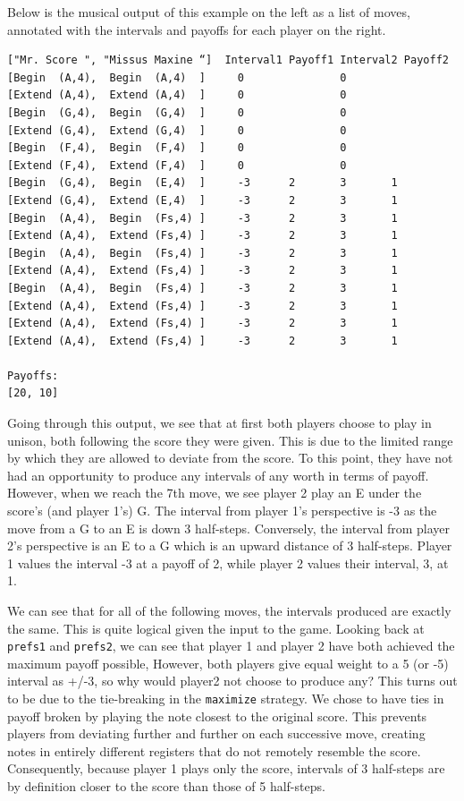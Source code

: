 \documentclass{article}
\begin{document}
Below is the musical output of this example on the left as a list of
moves, annotated with the intervals and payoffs for each player on the
right.

\begin{verbatim}
["Mr. Score ", "Missus Maxine “]  Interval1 Payoff1 Interval2 Payoff2
[Begin  (A,4),  Begin  (A,4)  ]     0               0        
[Extend (A,4),  Extend (A,4)  ]     0               0        
[Begin  (G,4),  Begin  (G,4)  ]     0               0        
[Extend (G,4),  Extend (G,4)  ]     0               0        
[Begin  (F,4),  Begin  (F,4)  ]     0               0        
[Extend (F,4),  Extend (F,4)  ]     0               0        
[Begin  (G,4),  Begin  (E,4)  ]     -3      2       3       1
[Extend (G,4),  Extend (E,4)  ]     -3      2       3       1
[Begin  (A,4),  Begin  (Fs,4) ]     -3      2       3       1
[Extend (A,4),  Extend (Fs,4) ]     -3      2       3       1
[Begin  (A,4),  Begin  (Fs,4) ]     -3      2       3       1
[Extend (A,4),  Extend (Fs,4) ]     -3      2       3       1
[Begin  (A,4),  Begin  (Fs,4) ]     -3      2       3       1
[Extend (A,4),  Extend (Fs,4) ]     -3      2       3       1
[Extend (A,4),  Extend (Fs,4) ]     -3      2       3       1
[Extend (A,4),  Extend (Fs,4) ]     -3      2       3       1

Payoffs:
[20, 10]
\end{verbatim}

Going through this output, we see that at first both players choose to
play in unison, both following the score they were given. This is due to
the limited range by which they are allowed to deviate from the score.
To this point, they have not had an opportunity to produce any intervals
of any worth in terms of payoff. However, when we reach the 7th move, we
see player 2 play an E under the score's (and player 1's) G. The
interval from player 1's perspective is -3 as the move from a G to an E
is down 3 half-steps. Conversely, the interval from player 2's
perspective is an E to a G which is an upward distance of 3 half-steps.
Player 1 values the interval -3 at a payoff of 2, while player 2 values
their interval, 3, at 1.

We can see that for all of the following moves, the intervals produced
are exactly the same. This is quite logical given the input to the game.
Looking back at \texttt{prefs1} and \texttt{prefs2}, we can see that player 1 and player 2
have both achieved the maximum payoff possible,
However, both players give equal weight to a 5 (or -5) interval as +/-3,
so why would player2 not choose to produce any? This turns out to be due
to the tie-breaking in the \texttt{maximize} strategy. We chose to have ties in
payoff broken by playing the note closest to the original score. This
prevents players from deviating further and further on each successive move,
creating notes in entirely different registers that do not remotely
resemble the score. Consequently, because player 1 plays only the score,
intervals of 3 half-steps are by definition closer to the score than
those of 5 half-steps.
\end{document}
